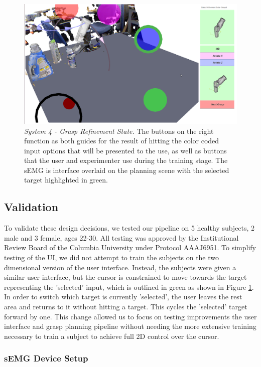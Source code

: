 \begin{figure}
\centering
\includegraphics[width=.99\columnwidth]{images_4/matlab_ui.png}
\caption{\emph{System 4 - Grasp Refinement State.} The buttons on the right function as both guides for the result of hitting the color coded input options that will be presented to the use, as well as buttons that the user and experimenter use during the training stage. The sEMG is interface overlaid on the planning scene with the selected target highlighted in green.}
\label{fig:ui-4-total-a}
\end{figure}


\subsection{Validation}
To validate these design decisions, we tested our pipeline on 5 healthy subjects, 2 male and 3 female, ages 22-30. All testing was approved by the Institutional Review Board of the Columbia University under Protocol AAAJ6951. To simplify testing of the UI, we did not attempt to train the subjects on the two dimensional version of the user interface. Instead, the subjects were given a similar user interface, but the cursor is constrained to move towards the target representing the 'selected' input, which is outlined in green as shown in Figure \ref{fig:ui-4-total-a}. In order to switch which target is currently 'selected', the user leaves the rest area and returns to it without hitting a target. This cycles the 'selected' target forward by one. This change allowed us to focus on testing improvements the user interface and grasp planning pipeline without needing the more extensive training necessary to train a subject to achieve full 2D control over the cursor. 

\subsubsection{sEMG Device Setup}

